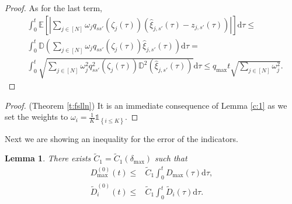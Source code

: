 \documentclass{article}
\newcommand{\E}{\mathbb{E}}
\renewcommand{\d}{\mathrm{d}}
\newcommand{\1}[1]{{\mathds{1}}_{\left\{#1\right\}}}
\newtheorem{lemma}{Lemma}
\newcommand{\remm}[1]{{#1}}
\begin{document}
{\begin{proof}
		As for the last term,
		\begin{align*}
			&\int_{0}^{t}\E \left[ \left| \sum_{j \in [N]} \omega_j q_{ss'}(\zeta_j(\tau)) \left(\hat{\xi}_{j,s'}(\tau)-z_{j,s'}(\tau) \right) \right| \right] \d \tau \leq \\
			&\int_{0}^{t} \mathbb{D} \left(\sum_{j \in [N]} \omega_j q_{ss'}(\zeta_j(\tau)) \hat{\xi}_{j,s'}(\tau)  \right)\d \tau =\\
			& \int_{0}^{t} \sqrt{\sum_{j \in [N]} \omega_{j}^2 q_{ss'}^2(\zeta_j(\tau)) \mathbb{D}^2 \left( \hat{\xi}_{j,s'}(\tau)\right)} \d \tau \leq q_{\textrm{max}}t \sqrt{\sum_{j \in [N]} \omega_j^2}.
		\end{align*}
	\end{proof}
	}

\remm{
	\begin{proof} (Theorem \ref{t:fslln})
	It is an immediate consequence of Lemma \ref{c:1} as we set the weights to  $\omega_i= \frac{1}{K}\1{i \leq K}.$ 
	\end{proof}
}		
	\remm{Next} we are showing an inequality for the error of the indicators.
	\begin{lemma}
		\label{l:D_0}
		There exists $\tilde{C}_1=\tilde{C}_1(\delta_{\max})$ such that
		\begin{align*}
			D_{\max}^{(0)}(t) \leq& \tilde{C}_1 \int_{0}^{t}D_{\max}(\tau) \d \tau, \\
			\tilde{D}_{i}^{(0)}(t) \leq & \tilde{C}_1 \int_{0}^{t} \tilde{D}_{i}(\tau) \d \tau . 
		\end{align*}
	\end{lemma} 	
	
\end{document}
